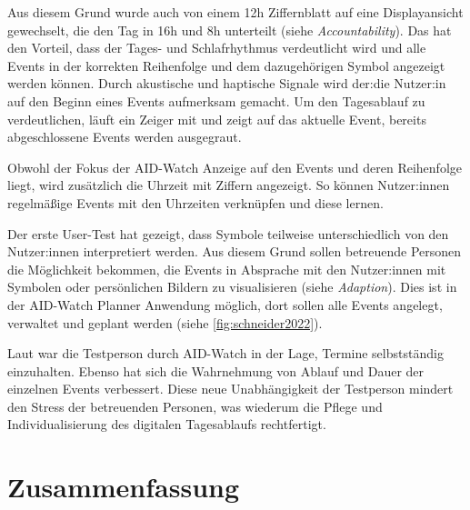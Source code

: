 \documentclass[sigchi-a,screen,nonacm,language=german]{acmart}
\theoremstyle{acmdefinition}
\begin{document}
Aus diesem Grund wurde auch von einem 12h Ziffernblatt auf eine Displayansicht gewechselt, die den Tag in 16h und 8h unterteilt (siehe \emph{Accountability}). Das hat den Vorteil, dass der Tages- und Schlafrhythmus verdeutlicht wird und alle Events in der korrekten Reihenfolge und dem dazugehörigen Symbol angezeigt werden können. %
Durch akustische und haptische Signale wird der:die Nutzer:in auf den Beginn eines Events aufmerksam gemacht. %
Um den Tagesablauf zu verdeutlichen, läuft ein Zeiger mit und zeigt auf das aktuelle Event, bereits abgeschlossene Events werden ausgegraut.

Obwohl der Fokus der AID-Watch Anzeige auf den Events und deren Reihenfolge liegt, wird zusätzlich die Uhrzeit mit Ziffern angezeigt. So können Nutzer:innen regelmäßige Events mit den Uhrzeiten verknüpfen und diese lernen. 

Der erste User-Test hat gezeigt, dass Symbole teilweise unterschiedlich von den Nutzer:innen interpretiert werden. Aus diesem Grund sollen betreuende Personen die Möglichkeit bekommen, die Events in Absprache mit den Nutzer:innen mit Symbolen oder persönlichen Bildern zu visualisieren (siehe \emph{Adaption}). Dies ist in der AID-Watch Planner Anwendung möglich, dort sollen alle Events angelegt, verwaltet und geplant werden (siehe \autoref{fig:schneider2022}). 


Laut \citet[][]{Schneider:2022:Aid-watch} war die Testperson durch AID-Watch in der Lage, Termine selbstständig einzuhalten. Ebenso hat sich die Wahrnehmung von Ablauf und Dauer der einzelnen Events verbessert.
Diese neue Unabhängigkeit der Testperson mindert den Stress der betreuenden Personen, was wiederum die Pflege und Individualisierung des digitalen Tagesablaufs rechtfertigt. 
  

\section{Zusammenfassung}
\label{sec:zusammenfassung}
\end{document}

